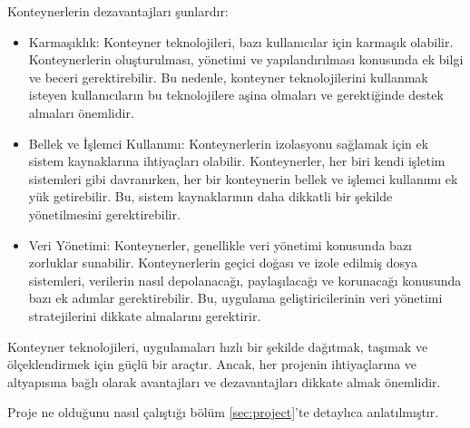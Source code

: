 Konteynerlerin dezavantajları şunlardır:
\begin{itemize}
  \item Karmaşıklık: Konteyner teknolojileri, bazı kullanıcılar için karmaşık olabilir. Konteynerlerin oluşturulması, yönetimi ve yapılandırılması konusunda ek bilgi ve beceri gerektirebilir. Bu nedenle, konteyner teknolojilerini kullanmak isteyen kullanıcıların bu teknolojilere aşina olmaları ve gerektiğinde destek almaları önemlidir.
  \item Bellek ve İşlemci Kullanımı: Konteynerlerin izolasyonu sağlamak için ek sistem kaynaklarına ihtiyaçları olabilir. Konteynerler, her biri kendi işletim sistemleri gibi davranırken, her bir konteynerin bellek ve işlemci kullanımı ek yük getirebilir. Bu, sistem kaynaklarının daha dikkatli bir şekilde yönetilmesini gerektirebilir.
  \item Veri Yönetimi: Konteynerler, genellikle veri yönetimi konusunda bazı zorluklar sunabilir. Konteynerlerin geçici doğası ve izole edilmiş dosya sistemleri, verilerin nasıl depolanacağı, paylaşılacağı ve korunacağı konusunda bazı ek adımlar gerektirebilir. Bu, uygulama geliştiricilerinin veri yönetimi stratejilerini dikkate almalarını gerektirir.
\end{itemize}

Konteyner teknolojileri, uygulamaları hızlı bir şekilde dağıtmak, taşımak ve ölçeklendirmek için güçlü bir araçtır. Ancak, her projenin ihtiyaçlarına ve altyapısına bağlı olarak avantajları ve dezavantajları dikkate almak önemlidir.

Proje ne olduğunu nasıl çalıştığı bölüm \ref{sec:project}'te detaylıca anlatılmıştır.